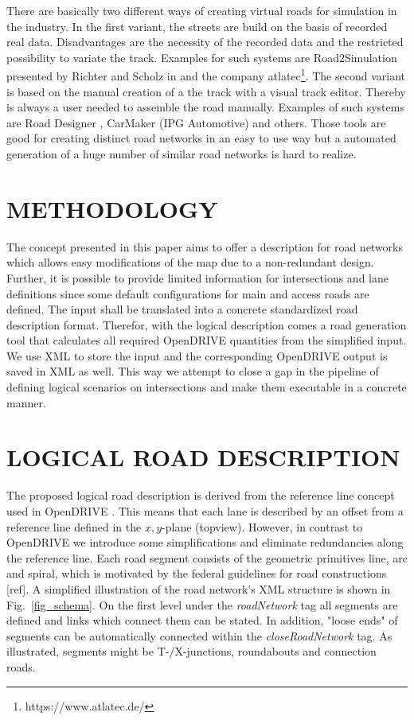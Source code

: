 \documentclass[a4paper, 10pt, conference]{ieeeconf}      %
\begin{document}
There are basically two different ways of creating virtual roads for simulation in the industry. In the first variant, the streets are build on the basis of recorded real data. Disadvantages are the necessity of the recorded data and the restricted possibility to variate the track. Examples for such systems are Road2Simulation presented by Richter and Scholz in \cite{dlr110094} and the company atlatec\footnote{https://www.atlatec.de/}.
The second variant is based on the manual creation of a the track with a visual track editor. Thereby is always a user needed to assemble the road manually. Examples of such systems are Road Designer \cite{ROD}, CarMaker (IPG Automotive) and others. Those tools are good for creating distinct road networks in an easy to use way but a automated generation of a huge number of similar road networks is hard to realize.

\section{METHODOLOGY}
The concept presented in this paper aims to offer a description for road networks which allows easy modifications of the map due to a non-redundant design. Further, it is possible to provide limited information for intersections and lane definitions since some default configurations for main and access roads are defined. The input shall be translated into a concrete standardized road description format. Therefor, with the logical description comes a road generation tool that calculates all required OpenDRIVE quantities from the simplified input. We use XML to store the input and the corresponding OpenDRIVE output is saved in XML as well. This way we attempt to close a gap in the pipeline of defining logical scenarios on intersections and make them executable in a concrete manner.

\section{LOGICAL ROAD DESCRIPTION}
The proposed logical road description is derived from the reference line concept used in OpenDRIVE \cite{odr1.5}. This means that each lane is described by an offset from a reference line defined in the $x,y$-plane (topview). However, in contrast to OpenDRIVE we introduce some simplifications and eliminate redundancies along the reference line. Each road segment consists of the geometric primitives line, arc and spiral, which is motivated by the federal guidelines for road constructions [ref]. A simplified illustration of the road network's XML structure is shown in Fig.~\ref{fig_schema}. On the first level under the \textit{roadNetwork} tag all segments are defined and links which connect them can be stated. In addition, "loose ends" of segments can be automatically connected within the \textit{closeRoadNetwork} tag. As illustrated, segments might be T-/X-junctions, roundabouts and connection roads. 
\end{document}
